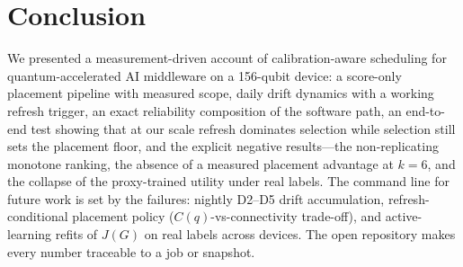 \documentclass[journal,10pt,twocolumn]{IEEEtran}
\begin{document}
\section{Conclusion}
We presented a measurement-driven account of calibration-aware scheduling for quantum-accelerated AI middleware on
a 156-qubit device: a score-only placement pipeline with measured scope, daily drift dynamics with a working
refresh trigger, an exact reliability composition of the software path, an end-to-end test showing that at our
scale refresh dominates selection while selection still sets the placement floor, and the explicit negative
results---the non-replicating monotone ranking, the absence of a measured placement advantage at $k{=}6$, and the
collapse of the proxy-trained utility under real labels. The command line for future work is set by the failures:
nightly D2--D5 drift accumulation, refresh-conditional placement policy ($C(q)$-vs-connectivity trade-off), and
active-learning refits of $J(G)$ on real labels across devices. The open repository makes every number traceable to
a job or snapshot.
\end{document}
